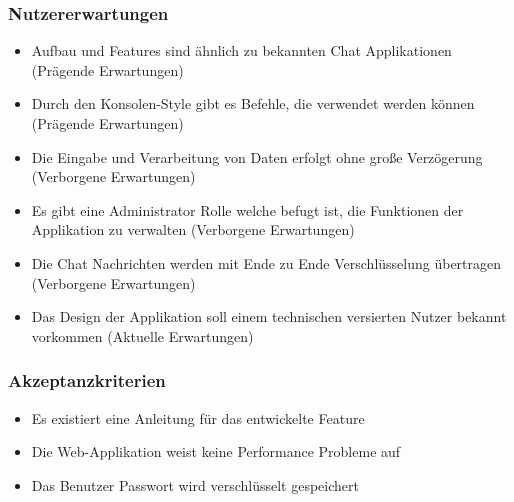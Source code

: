 \subsubsection{Nutzererwartungen}
\begin{itemize}
  \item Aufbau und Features sind ähnlich zu bekannten Chat Applikationen (Prägende Erwartungen)
  \item Durch den Konsolen-Style gibt es Befehle, die verwendet werden können (Prägende Erwartungen)
  \item Die Eingabe und Verarbeitung von Daten erfolgt ohne große Verzögerung (Verborgene Erwartungen)
  \item Es gibt eine Administrator Rolle welche befugt ist, die Funktionen der Applikation zu verwalten (Verborgene Erwartungen)
  \item Die Chat Nachrichten werden mit Ende zu Ende Verschlüsselung übertragen (Verborgene Erwartungen)
  \item Das Design der Applikation soll einem technischen versierten Nutzer bekannt vorkommen (Aktuelle Erwartungen)
\end{itemize}

\subsubsection{Akzeptanzkriterien}
\begin{itemize}
  \item Es existiert eine Anleitung für das entwickelte Feature
  \item Die Web-Applikation weist keine Performance Probleme auf
  \item Das Benutzer Passwort wird verschlüsselt gespeichert
\end{itemize}

